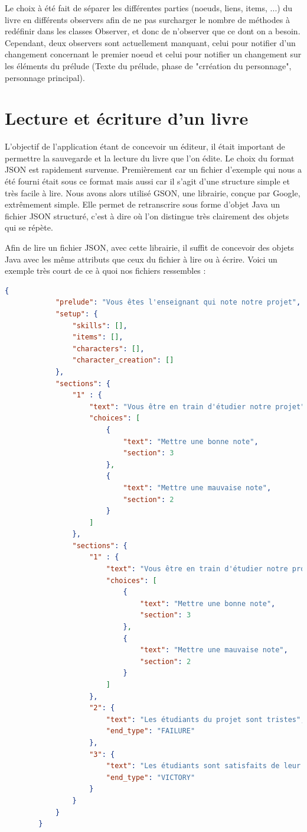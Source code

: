 			Le choix à été fait de séparer les différentes parties (noeuds, liens, items, ...) du livre en différents observers afin de ne pas surcharger le nombre de méthodes à redéfinir dans les classes Observer, et donc de n'observer que ce dont on a besoin. Cependant, deux observers sont actuellement manquant, celui pour notifier d'un changement concernant le premier noeud et celui pour notifier un changement sur les éléments du prélude (Texte du prélude, phase de "crréation du personnage", personnage principal).

	\section{Lecture et écriture d'un livre}\label{sec:Json}

		L'objectif de l'application étant de concevoir un éditeur, il était important de permettre la sauvegarde et la lecture du livre que l'on édite. Le choix du format JSON est rapidement survenue. Premièrement car un fichier d'exemple qui nous a été fourni était sous ce format mais aussi car il s'agit d'une structure simple et très facile à lire. Nous avons alors utilisé GSON, une librairie, conçue par Google, extrêmement simple. Elle permet de retranscrire sous forme d'objet Java un fichier JSON structuré, c'est à dire où l'on distingue très clairement des objets qui se répète.

		Afin de lire un fichier JSON, avec cette librairie, il suffit de concevoir des objets Java avec les même attributs que ceux du fichier à lire ou à écrire. Voici un exemple très court de ce à quoi nos fichiers ressembles :

		\begin{lstlisting}[gobble=8, language=json, caption=Exemple de livre très simple, label=lst:exemple_livre]
		{
			"prelude": "Vous êtes l'enseignant qui note notre projet",
			"setup": {
				"skills": [],
				"items": [],
				"characters": [],
				"character_creation": []
			},
			"sections": {
				"1" : {
					"text": "Vous être en train d'étudier notre projet",
					"choices": [
						{
							"text": "Mettre une bonne note",
							"section": 3
						},
						{
							"text": "Mettre une mauvaise note",
							"section": 2
						}
					]
				},
				"sections": {
					"1" : {
						"text": "Vous être en train d'étudier notre projet",
						"choices": [
							{
								"text": "Mettre une bonne note",
								"section": 3
							},
							{
								"text": "Mettre une mauvaise note",
								"section": 2
							}
						]
					},
					"2": {
						"text": "Les étudiants du projet sont tristes",
						"end_type": "FAILURE"
					},
					"3": {
						"text": "Les étudiants sont satisfaits de leur travail",
						"end_type": "VICTORY"
					}
				}
			}
		}
		\end{lstlisting}

